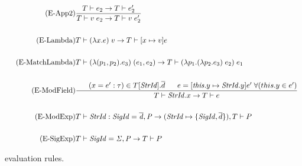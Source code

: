 \begin{figure}[htb]
\begin{align*}
\tag{E-App2}
&\frac{T \vdash e_{2} \rightarrow T \vdash e_{2}'}
{T \vdash v\;e_{2} \rightarrow T \vdash v\;e_{2}'}\\ \\
\tag{E-Lambda}
&T \vdash (\lambda x . e) \; v \rightarrow T \vdash [x \mapsto v]e \\ \\
\tag{E-MatchLambda}
&T \vdash (\lambda (p_{1},p_{2}) . e_{3}) \; (e_{1},e_{2}) \rightarrow T \vdash (\lambda p_{1}.(\lambda p_{2}.e_{3})\;e_{2})\; e_{1} \\
\\
\tag{E-ModField}
&\frac{\;\;\;\;\;\; (x=e':\tau) \in T[\mathit{StrId}].\overline{d} \;\;\;\;\;\; e=[\mathit{this}.y\mapsto \mathit{StrId}.y]e'\;\forall (this.y \in e')}
{T \vdash \mathit{StrId}.x \rightarrow T \vdash e}\\
\\
\tag{E-ModExp}
&T \vdash \mathit{StrId:SigId = \overline{d},P} \rightarrow (\mathit{StrId} \mapsto \lbrace \mathit{SigId},\overline{d}\rbrace), T \vdash P \\
\\
\tag{E-SigExp}
&T \vdash \mathit{SigId = \Sigma, P} \rightarrow T \vdash P
\end{align*}
\caption{\MiniML\ evaluation rules.\label{fig:MiniMLOperationalSemantics}}
\end{figure}

